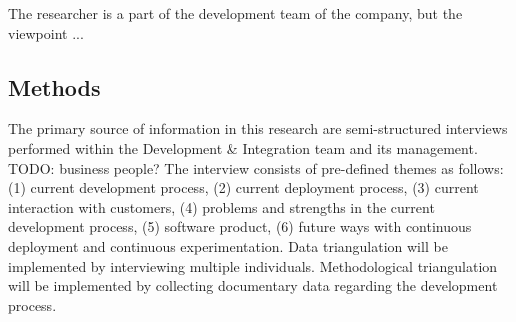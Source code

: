 \documentclass[english]{tktltiki2}
\theoremstyle{definition}
\theoremstyle{remark}
\begin{document}

The researcher is a part of the development team of the company, but the viewpoint ...


\subsection{Methods} %
The primary source of information in this research are semi-structured interviews performed within the Development \& Integration team and its management. TODO: business people? The interview consists of pre-defined themes as follows: (1) current development process, (2) current deployment process, (3) current interaction with customers, (4) problems and strengths in the current development process, (5) software product, (6) future ways with continuous deployment and continuous experimentation. Data triangulation will be implemented by interviewing multiple individuals. Methodological triangulation will be implemented by collecting documentary data regarding the development process. 	
\end{document}
